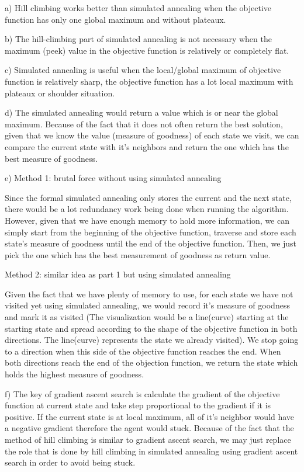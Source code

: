 \documentclass{article}
\begin{document}
a) Hill climbing works better than simulated annealing when the objective function has only one global maximum and without plateaux.

b) The hill-climbing part of simulated annealing is not necessary when the maximum (peek) value in the objective function is relatively or completely flat.

c) Simulated annealing is useful when the local/global maximum of objective function is relatively sharp, the objective function has a lot local maximum with plateaux or shoulder situation.

d) The simulated annealing would return a value which is or near the global maximum. Because of the fact that it does not often return the best solution, given that we know the value (measure of goodness) of each state we visit, we can compare the current state with it's neighbors and return the one which has the best measure of goodness.

e) Method 1: brutal force without using simulated annealing

Since the formal simulated annealing only stores the current and the next state, there would be a lot redundancy work being done when running the algorithm. However, given that we have enough memory to hold more information, we can simply start from the beginning of the objective function, traverse and store each state's measure of goodness until the end of the objective function. Then, we just pick the one which has the best measurement of goodness as return value.

Method 2: similar idea as part 1 but using simulated annealing

Given the fact that we have plenty of memory to use, for each state we have not visited yet using simulated annealing, we would record it's measure of goodness and mark it as visited (The visualization would be a line(curve) starting at the starting state and spread according to the shape of the objective function in both directions. The line(curve) represents the state we already visited). We stop going to a direction when this side of the objective function reaches the end. When both directions reach the end of the objection function, we return the state which holds the highest measure of goodness.

f) The key of gradient ascent search is calculate the gradient of the objective function at current state and take step proportional to the gradient if it is positive. If the current state is at local maximum, all of it's neighbor would have a negative gradient therefore the agent would stuck. Because of the fact that the method of hill climbing is similar to gradient ascent search, we may just replace the role that is done by hill climbing in simulated annealing using gradient ascent search in order to avoid being stuck.
\end{document}
